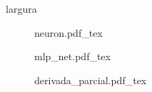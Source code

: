 \documentclass{article}
\begin{document}
\printlength\textwidth largura
\begin{figure}[h!]
    \def\svgwidth{\linewidth}
    \centering
    {neuron.pdf_tex}
\end{figure}

\begin{figure}[h!]
    \def\svgwidth{\linewidth}
    \centering
    {mlp_net.pdf_tex}
\end{figure}

\begin{figure}[h!]
    \def\svgwidth{\linewidth}
    \centering
    {derivada_parcial.pdf_tex}
\end{figure}
\end{document}
